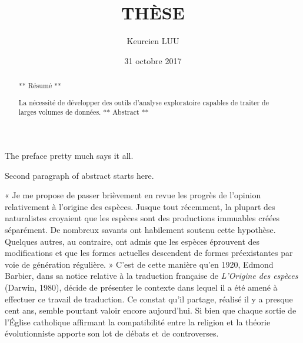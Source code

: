 \documentclass[12pt,twoside]{reedthesis}
\title{THÈSE}
\author{Keurcien LUU}
\date{31 octobre 2017}
\begin{document}
      \maketitle
  
  \frontmatter %
  \pagestyle{empty} %

      \begin{acknowledgements}
      The preface pretty much says it all. \par  Second paragraph of abstract
      starts here.
    \end{acknowledgements}
  
      \begin{preface}
      « Je me propose de passer brièvement en revue les progrès de l'opinion
      relativement à l'origine des espèces. Jusque tout récemment, la plupart
      des naturalistes croyaient que les espèces sont des productions
      immuables créées séparément. De nombreux savants ont habilement soutenu
      cette hypothèse. Quelques autres, au contraire, ont admis que les
      espèces éprouvent des modifications et que les formes actuelles
      descendent de formes préexistantes par voie de génération régulière. »
      C'est de cette manière qu'en 1920, Edmond Barbier, dans sa notice
      relative à la traduction française de \textit{L'Origine des espèces}
      (Darwin, 1980), décide de présenter le contexte dans lequel il a été
      amené à effectuer ce travail de traduction. Ce constat qu'il partage,
      réalisé il y a presque cent ans, semble pourtant valoir encore
      aujourd'hui. Si bien que chaque sortie de l'Église catholique affirmant
      la compatibilité entre la religion et la théorie évolutionniste apporte
      son lot de débats et de controverses. \par
    \end{preface}
  
      \hypersetup{linkcolor=black}
    \setcounter{tocdepth}{2}
    \tableofcontents
  
      \listoftables
  
      \listoffigures
  
      \begin{abstract}
      ** Résumé ** \par  La nécessité de développer des outils d'analyse
      exploratoire capables de traiter de larges volumes de données. **
      Abstract **
    \end{abstract}
  
\end{document}
